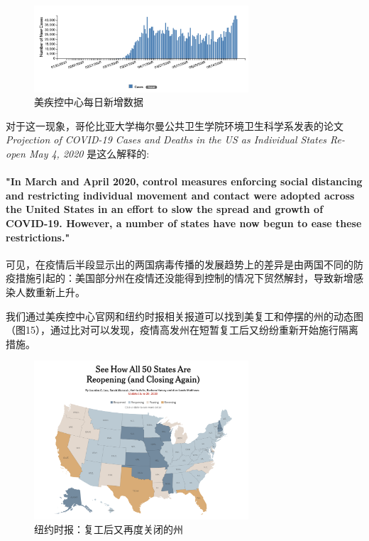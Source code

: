 \documentclass[UTF8]{ctexart}
\begin{document}
\begin{figure}[htbp][H]
\centering
\includegraphics[width=8cm]{caseIncrease.png} 
\caption{美疾控中心每日新增数据}
\end{figure}
\par

对于这一现象，哥伦比亚大学梅尔曼公共卫生学院环境卫生科学系发表的论文\textit{Projection of COVID-19 Cases and Deaths in the US as Individual States Re-open May 4, 2020
}\cite{papercdc}是这么解释的:
\par
\paragraph{
"In March and April 2020, 
control measures enforcing social distancing and 
restricting individual movement and contact were 
adopted across the United States in an effort to 
slow the spread and growth of COVID-19. However, 
a number of states have now begun to ease these restrictions."\cite{papercdc} }
\par
可见，在疫情后半段显示出的两国病毒传播的发展趋势上的差异是由两国不同的防疫措施引起的：美国部分州在疫情还没能得到控制的情况下贸然解封，导致新增感染人数重新上升。\\

\par 
我们通过美疾控中心官网和纽约时报\cite{nyt}相关报道可以找到美复工和停摆的州的动态图（图15），通过比对可以发现，疫情高发州在短暂复工后又纷纷重新开始施行隔离措施。

\begin{figure}[htbp][H]
\centering
\includegraphics[width=8cm]{nyt.png} 
\caption{纽约时报：复工后又再度关闭的州}
\end{figure}
\par
\end{document}
